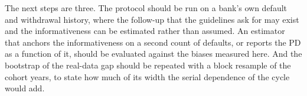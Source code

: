 The next steps are three. The protocol should be run on a bank's own default and withdrawal history, where the follow-up that the guidelines ask for may exist and the informativeness can be estimated rather than assumed. An estimator that anchors the informativeness on a second count of defaults, or reports the PD as a function of it, should be evaluated against the biases measured here. And the bootstrap of the real-data gap should be repeated with a block resample of the cohort years, to state how much of its width the serial dependence of the cycle would add.
